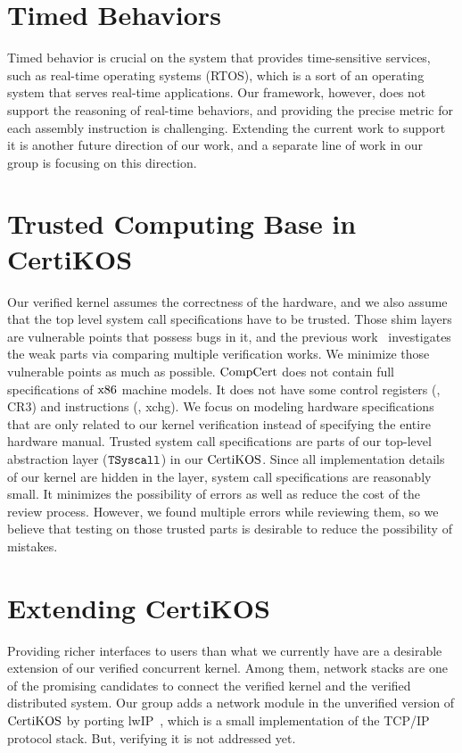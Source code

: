\section{Timed Behaviors}

Timed behavior is crucial on the system that provides time-sensitive services, such as real-time operating systems (RTOS),
which is a sort of an operating system that serves real-time applications.
Our framework, however, does not support the reasoning of real-time behaviors,
and providing the precise metric for each assembly instruction is challenging. 
Extending the current work to support it is another future direction of our work, and a separate line of work in our group is focusing on this direction. 


\section{Trusted Computing Base in CertiKOS}

Our verified kernel assumes the correctness of the hardware, and we also assume that the top level system call specifications have to be trusted.
Those shim layers are vulnerable points that possess bugs in it, and the previous work~\cite{shimlayer} investigates the weak parts via comparing multiple verification works. We minimize those vulnerable points as much as possible. 
$\mathrm{CompCert}$ does not contain full specifications of $\mathrm{x86}$ machine models.
It does not have some control registers (\eg, CR3) and 
instructions (\eg, xchg).
We focus on modeling hardware specifications that are only related to our kernel verification instead of specifying the entire hardware manual.
Trusted system call specifications are parts of our top-level abstraction layer (${{\mathrm{\texttt{TSyscall}}}}$) in our $\mathrm{CertiKOS}$.
Since all implementation details of our kernel are hidden in the layer, 
system call specifications are reasonably small.
It minimizes the possibility of errors as well as reduce the cost of the review process. 
However, we found multiple errors while reviewing them, so we believe that testing on those trusted parts is desirable to reduce the possibility of mistakes.  


\section{Extending CertiKOS}

Providing richer interfaces to users than what we currently have are a desirable extension of our verified concurrent kernel.
Among them, 
network stacks are one of the promising candidates to connect the verified kernel and the verified distributed system. 
Our group adds a network module in the unverified version of  $\mathrm{CertiKOS}$ by porting lwIP~\cite{lwip},  which is a small implementation of the TCP/IP protocol stack. 
But, verifying it is not addressed yet. 


